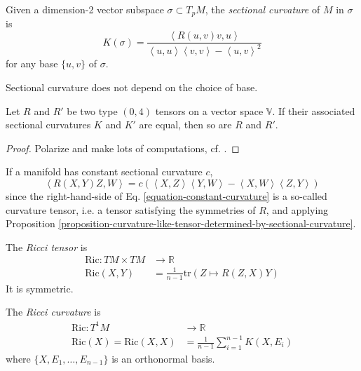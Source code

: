 Given a dimension-2 vector subspace $\sigma\subset T_pM$, the {\it sectional
curvature} of $M$ in $\sigma$ is
\begin{equation}
\label{equation-sectional-curvature}
K(\sigma)=\frac{\left<R(u,v)v,u\right>}
{\left<u,u\right>\left<v,v\right>-\left<u,v\right>^2}
\end{equation}
for any base $\{u,v\}$ of $\sigma$.

\begin{lemma}
\label{lemma-sectional-curvature-is-well-defined}
Sectional curvature does not depend on the choice of base.
\end{lemma}

\begin{proposition}
\label{proposition-curvature-like-tensor-determined-by-sectional-curvature}
Let $R$ and $R'$ be two type $(0,4)$ tensors on a vector space $\mathbb{V}$. If
their associated sectional curvatures $K$ and $K'$ are equal, then so are $R$
and $R'$.
\end{proposition}

\begin{proof}
Polarize and make lots of computations, cf. \cite{doc}.
\end{proof}

If a manifold has constant sectional curvature $c$,
\begin{equation}
\label{equation-constant-curvature}
\left<R(X,Y)Z,W\right>=
c(\left<X,Z\right>\left<Y,W\right>-\left<X,W\right>\left<Z,Y\right>)
\end{equation}
since the right-hand-side of Eq. \ref{equation-constant-curvature} is a
so-called curvature tensor, i.e. a tensor satisfying the symmetries of $R$, and
applying Proposition 
\ref{proposition-curvature-like-tensor-determined-by-sectional-curvature}.

The {\it Ricci tensor} is
\begin{equation}
\label{equation-Ricci-tensor}
\begin{aligned}
\text{Ric}: TM\times TM &\longrightarrow \mathbb{R} \\
\text{Ric}(X,Y)&=\frac{1}{n-1}\text{tr}(Z\mapsto R(Z,X)Y)
\end{aligned}
\end{equation}
It is symmetric.

The {\it Ricci curvature} is
\begin{equation}
\label{equation-Ricci-curvature}
\begin{aligned}
\text{Ric}: T^1M &\longrightarrow \mathbb{R} \\
\text{Ric}(X)=\text{Ric}(X,X)&=\frac{1}{n-1}\sum_{i=1}^{n-1}K(X,E_i)
\end{aligned}
\end{equation}
where $\{X,E_1,\ldots,E_{n-1}\}$ is an orthonormal basis.

